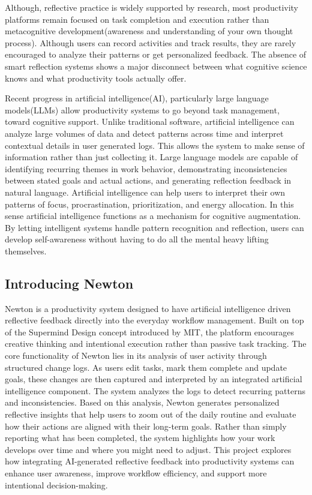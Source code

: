\documentclass[12pt]{article}
\begin{document}
Although, reflective practice is widely supported by research, most productivity platforms remain focused on task completion and 
execution rather than metacognitive development(awareness and understanding of your own thought process). Although users can record 
activities and track results, they are rarely encouraged to analyze their patterns or get personalized feedback. The absence of
 smart reflection systems shows a major disconnect between what cognitive science knows and what productivity tools actually offer.

Recent progress in artificial intelligence(AI), particularly large language models(LLMs) allow productivity systems to go beyond task 
management, toward cognitive support. Unlike traditional software, artificial intelligence can analyze large volumes of data and
 detect patterns across time and interpret contextual details in user generated logs. This allows the system to make sense of 
 information rather than just collecting it. Large language models are capable of identifying recurring themes in work behavior, 
 demonstrating inconsistencies between stated goals and actual actions, and generating reflection feedback in natural language.
  Artificial intelligence can help users to interpret their own patterns of focus, procrastination, prioritization, and energy
   allocation. In this sense artificial intelligence functions as a mechanism for cognitive augmentation. By letting intelligent 
   systems handle pattern recognition and reflection, users can develop self-awareness without having to do all the mental heavy
    lifting themselves.


\subsection{	Introducing Newton}
Newton is a productivity system designed to have artificial intelligence driven reflective feedback directly into the everyday 
workflow management. Built on top of the Supermind Design concept introduced by MIT\cite{10.1145/3643562.3672611}, the platform
 encourages creative thinking and intentional execution rather than passive task tracking. The core functionality of Newton lies
 in its analysis of user activity through structured change logs. 
As users edit tasks, mark them complete and update goals, these changes are then captured and interpreted by an integrated 
artificial intelligence component. The system analyzes the logs to detect recurring patterns and inconsistencies. Based on
 this analysis, Newton generates personalized reflective insights that help users to zoom out of the daily routine and evaluate
  how their actions are aligned with their long-term goals. Rather than simply reporting what has been completed, the system 
  highlights how your work develops over time and where you might need to adjust.
This project explores how integrating AI-generated reflective feedback into productivity systems can enhance user awareness, 
improve workflow efficiency, and support more intentional decision-making.
\end{document}
